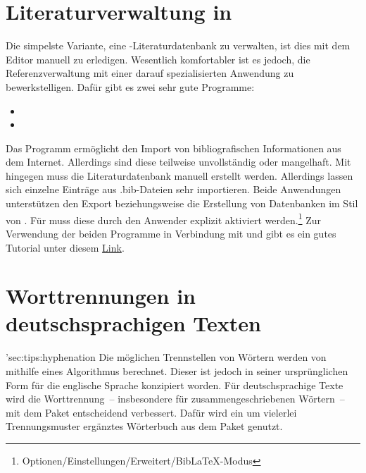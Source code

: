 \section{Literaturverwaltung in }
%
Die simpelste Variante, eine -Literaturdatenbank zu verwalten, 
ist dies mit dem Editor manuell zu erledigen. Wesentlich komfortabler ist es 
jedoch, die Referenzverwaltung mit einer darauf spezialisierten Anwendung zu 
bewerkstelligen. Dafür gibt es zwei sehr gute Programme:
%
\begin{itemize}
\item {}
\item {}
\end{itemize}
%
Das Programm  ermöglicht den Import von bibliografischen 
Informationen aus dem Internet. Allerdings sind diese teilweise unvollständig 
oder mangelhaft. Mit  hingegen muss die Literaturdatenbank 
manuell erstellt werden. Allerdings lassen sich einzelne Einträge aus 
.bib-Dateien sehr importieren. Beide Anwendungen unterstützen den Export 
beziehungsweise die Erstellung von Datenbanken im Stil von . 
Für  muss diese durch den Anwender explizit aktiviert 
werden.\footnote{Optionen/Einstellungen/Erweitert/BibLaTeX-Modus} 
Zur Verwendung der beiden Programme in Verbindung mit  und 
 gibt es ein gutes Tutorial unter diesem
\href{http://www.suedraum.de/latex/stammtisch/degenkolb_latex_biblatex_folien-final.pdf}{Link}.



\section{Worttrennungen in deutschsprachigen Texten}
\manualhyperdef'{sec:tips:hyphenation}
%
%
Die möglichen Trennstellen von Wörtern werden von  mithilfe 
eines Algorithmus berechnet. Dieser ist jedoch in seiner ursprünglichen Form 
für die englische Sprache konzipiert worden. Für deutschsprachige Texte wird 
die Worttrennung~-- insbesondere für zusammengeschriebenen Wörtern~-- mit dem 
Paket  entscheidend verbessert. Dafür wird ein um vielerlei 
Trennungsmuster ergänztes Wörterbuch aus dem Paket  
genutzt. 


